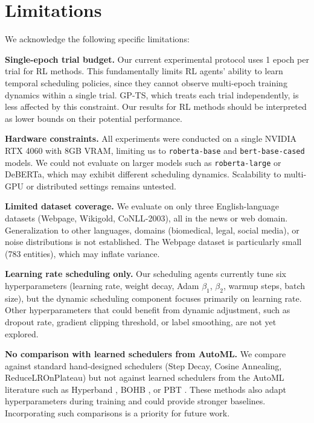 \documentclass[11pt]{article}
\begin{document}
\section{Limitations}

We acknowledge the following specific limitations:

\textbf{Single-epoch trial budget.} Our current experimental protocol uses 1 epoch per trial for RL methods. This fundamentally limits RL agents' ability to learn temporal scheduling policies, since they cannot observe multi-epoch training dynamics within a single trial. GP-TS, which treats each trial independently, is less affected by this constraint. Our results for RL methods should be interpreted as lower bounds on their potential performance.

\textbf{Hardware constraints.} All experiments were conducted on a single NVIDIA RTX 4060 with 8GB VRAM, limiting us to \texttt{roberta-base} and \texttt{bert-base-cased} models. We could not evaluate on larger models such as \texttt{roberta-large} or DeBERTa, which may exhibit different scheduling dynamics. Scalability to multi-GPU or distributed settings remains untested.

\textbf{Limited dataset coverage.} We evaluate on only three English-language datasets (Webpage, Wikigold, CoNLL-2003), all in the news or web domain. Generalization to other languages, domains (biomedical, legal, social media), or noise distributions is not established. The Webpage dataset is particularly small (783 entities), which may inflate variance.

\textbf{Learning rate scheduling only.} Our scheduling agents currently tune six hyperparameters (learning rate, weight decay, Adam $\beta_1$, $\beta_2$, warmup steps, batch size), but the dynamic scheduling component focuses primarily on learning rate. Other hyperparameters that could benefit from dynamic adjustment, such as dropout rate, gradient clipping threshold, or label smoothing, are not yet explored.

\textbf{No comparison with learned schedulers from AutoML.} We compare against standard hand-designed schedulers (Step Decay, Cosine Annealing, ReduceLROnPlateau) but not against learned schedulers from the AutoML literature such as Hyperband \cite{li2018hyperband}, BOHB \cite{falkner2018bohb}, or PBT \cite{jaderberg2017population}. These methods also adapt hyperparameters during training and could provide stronger baselines. Incorporating such comparisons is a priority for future work.
\end{document}
